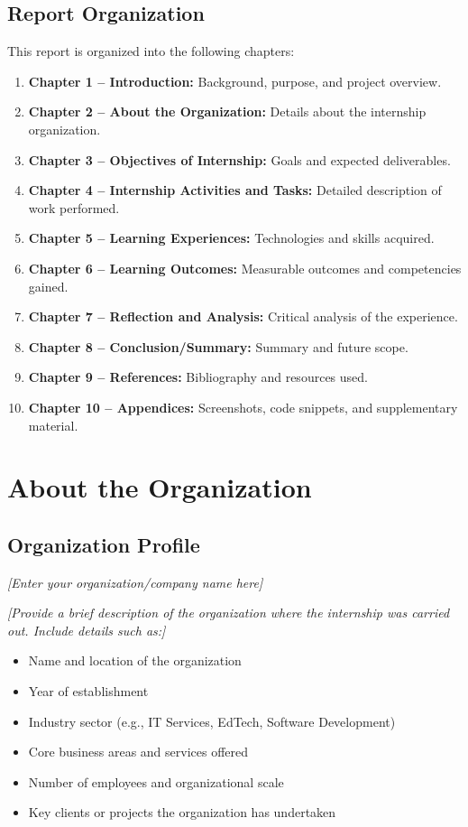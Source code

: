 \documentclass[12pt,a4paper]{report}
\begin{document}
\section{Report Organization}
This report is organized into the following chapters:
\begin{enumerate}
    \item \textbf{Chapter 1 -- Introduction:} Background, purpose, and project overview.
    \item \textbf{Chapter 2 -- About the Organization:} Details about the internship organization.
    \item \textbf{Chapter 3 -- Objectives of Internship:} Goals and expected deliverables.
    \item \textbf{Chapter 4 -- Internship Activities and Tasks:} Detailed description of work performed.
    \item \textbf{Chapter 5 -- Learning Experiences:} Technologies and skills acquired.
    \item \textbf{Chapter 6 -- Learning Outcomes:} Measurable outcomes and competencies gained.
    \item \textbf{Chapter 7 -- Reflection and Analysis:} Critical analysis of the experience.
    \item \textbf{Chapter 8 -- Conclusion/Summary:} Summary and future scope.
    \item \textbf{Chapter 9 -- References:} Bibliography and resources used.
    \item \textbf{Chapter 10 -- Appendices:} Screenshots, code snippets, and supplementary material.
\end{enumerate}


\chapter{About the Organization}

\section{Organization Profile}
\textit{[Enter your organization/company name here]}

\textit{[Provide a brief description of the organization where the internship was carried out. Include details such as:]}
\begin{itemize}
    \item Name and location of the organization
    \item Year of establishment
    \item Industry sector (e.g., IT Services, EdTech, Software Development)
    \item Core business areas and services offered
    \item Number of employees and organizational scale
    \item Key clients or projects the organization has undertaken
\end{itemize}
\end{document}
